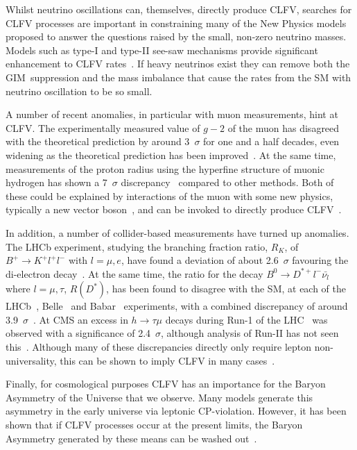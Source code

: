 Whilst neutrino oscillations can, themselves, directly produce \ac{CLFV}, searches for CLFV processes are important in constraining many of the New Physics models proposed to answer the questions raised by the small, non-zero neutrino masses.
Models such as type-I and type-II see-saw mechanisms provide significant enhancement to \ac{CLFV} rates~\cite{Dinh:2012bp}.
If heavy neutrinos exist they can remove both the GIM~suppression and the mass imbalance that cause the rates from the \ac{SM} with neutrino oscillation to be so small.

A number of recent anomalies, in particular with muon measurements, hint at \ac{CLFV}.
The experimentally measured value of $g-2$ of the muon has disagreed with the theoretical prediction by around 3~$\sigma$ for one and a half decades, even widening as the theoretical prediction has been improved~\cite{Blum:2013xva,Brown:2001mga}.
At the same time, measurements of the proton radius using the hyperfine structure of muonic hydrogen has shown a 7~$\sigma$ discrepancy~\cite{Antognini:1900ns} compared to other methods.
Both of these could be explained by interactions of the muon with some new physics, typically a new vector boson~\cite{Martens:2016zzx,Karshenboim:2014tka}, and can be invoked to directly produce CLFV~\cite{Heeck:2016xkh}.

In addition, a number of collider-based measurements have turned up anomalies.
The LHCb experiment, studying the branching fraction ratio, $R_K$, of $B^+\rightarrow{}K^+l^+l^-$ with $l=\mu,e$, have found a deviation of about 2.6~$\sigma$ favouring the di-electron decay~\cite{Aaij:2014ora}.
At the same time,  the ratio for the decay $B^0\rightarrow D^{*+}l^-\bar{\nu_l}$ where $l=\mu,\tau$, $R(D^*)$, has been found to disagree with the SM, at each of the LHCb~\cite{Aaij:2015yra}, Belle~\cite{Abdesselam:2016cgx} and Babar~\cite{Lees:2012xj} experiments, with a combined discrepancy of around 3.9~$\sigma$~\cite{Lafferty:2016ckl}.
At CMS an excess in $h\rightarrow\tau\mu$ decays during Run-1 of the LHC~\cite{Khachatryan:2015kon} was observed with a significance of 2.4~$\sigma$, although analysis of Run-II has not seen this~\cite{CMS:2016qvi}.
Although many of these discrepancies directly only require lepton non-universality, this can be shown to imply \ac{CLFV} in many cases~\cite{Glashow:2014iga}.

Finally, for cosmological purposes \ac{CLFV} has an importance for the Baryon Asymmetry of the Universe that we observe.
Many models generate this asymmetry in the early universe via leptonic CP-violation.
However, it has been shown that if \ac{CLFV} processes occur at the present limits, the Baryon Asymmetry generated by these means can be washed out~\cite{Deppisch:2015yqa}.

